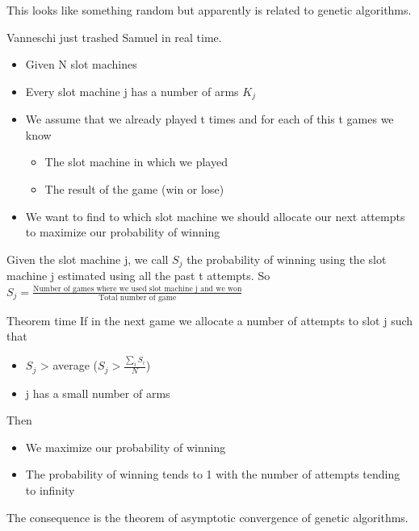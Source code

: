 This looks like something random but apparently is related to genetic algorithms.

\vspace{10pt}

Vanneschi just trashed Samuel in real time.

\vspace{10pt}


\begin{itemize}
    \item Given N slot machines
    \item Every slot machine j has a number of arms $K_j$
    \item We assume that we already played t times and for each of this t games we know 
    \begin{itemize}
        \item The slot machine in which we played 
        \item The result of the game (win or lose)
    \end{itemize}
    \item We want to find to which slot machine we should allocate our next attempts to maximize our probability of winning 
\end{itemize}

Given the slot machine j, we call $S_j$ the probability of winning using the slot machine j estimated using all the past t attempts. So $S_j = \frac{\text{Number of games where we used slot machine j and we won}}{\text{Total number of game}}$

\vspace{10pt}

Theorem time \ra If in the next game we allocate a number of attempts to slot j such that

\begin{itemize}
    \item $S_j $ > average ($S_j > \frac{\sum_{i}S_i}{N}$)
    \item j has a small number of arms
\end{itemize}

Then \begin{itemize}
    \item We maximize our probability of winning
    \item The probability of winning tends to 1 with the number of attempts tending to infinity
\end{itemize}

The consequence is the theorem of asymptotic convergence of genetic algorithms.

